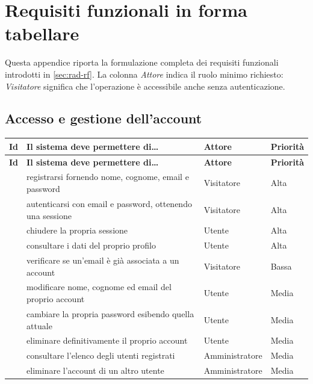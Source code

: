 \chapter{Requisiti funzionali in forma tabellare}
\label{cap:rad-app-requisiti}

Questa appendice riporta la formulazione completa dei requisiti funzionali
introdotti in \cref{sec:rad-rf}. La colonna \emph{Attore} indica il ruolo
minimo richiesto: \emph{Visitatore} significa che l'operazione è accessibile
anche senza autenticazione.

\section{Accesso e gestione dell'account}

\begin{longtable}{@{}l L{7.3cm} L{2.6cm} L{1.8cm}@{}}
\toprule
\textbf{Id} & \textbf{Il sistema deve permettere di\dots} & \textbf{Attore} &
\textbf{Priorità} \\
\midrule
\endfirsthead
\toprule
\textbf{Id} & \textbf{Il sistema deve permettere di\dots} & \textbf{Attore} &
\textbf{Priorità} \\
\midrule
\endhead
\bottomrule
\endlastfoot

 & registrarsi fornendo nome, cognome, email e password &
  Visitatore & Alta \\
 & autenticarsi con email e password, ottenendo una sessione &
  Visitatore & Alta \\
 & chiudere la propria sessione & Utente & Alta \\
 & consultare i dati del proprio profilo & Utente & Alta \\
 & verificare se un'email è già associata a un account &
  Visitatore & Bassa \\
 & modificare nome, cognome ed email del proprio account &
  Utente & Media \\
 & cambiare la propria password esibendo quella attuale &
  Utente & Media \\
 & eliminare definitivamente il proprio account & Utente & Media \\
 & consultare l'elenco degli utenti registrati &
  Amministratore & Media \\
 & eliminare l'account di un altro utente &
  Amministratore & Media \\

\end{longtable}

